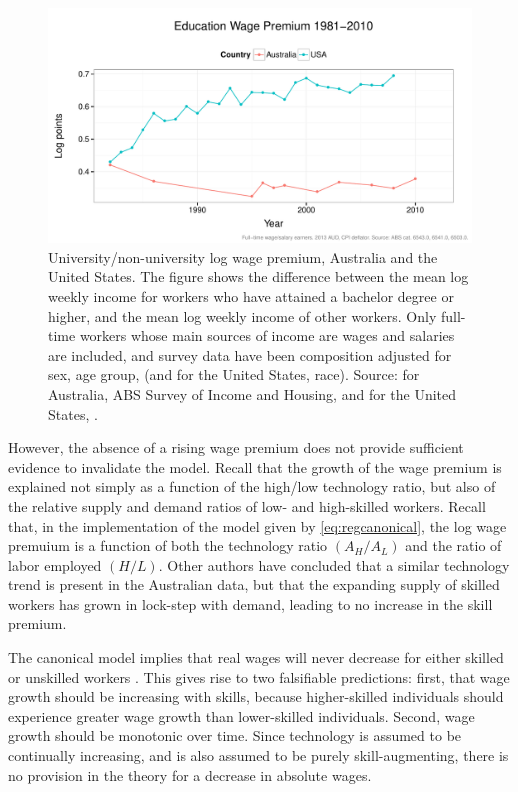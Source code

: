 \begin{figure}[th]
  \centering
  \includegraphics[width=\textwidth]{../figure/ed_premium_time_two.pdf}
  \caption{University/non-university log wage premium, Australia and the United States. The figure shows the difference between the mean log weekly income for workers who have attained a bachelor degree or higher, and the mean log weekly income of other workers. Only full-time workers whose main sources of income are wages and salaries are included, and survey data have been composition adjusted for sex, age group, (and for the United States, race). Source: for Australia, ABS Survey of Income and Housing, and for the United States, \citet{Acemoglu2011}.}
  \label{fig:wagepremium}
\end{figure}

However, the absence of a rising wage premium does not provide sufficient evidence to invalidate the model. Recall that the growth of the wage premium is explained not simply as a function of the high/low technology ratio, but also of the relative supply and demand ratios of low- and high-skilled workers. Recall that, in the \citet{Katz1992} implementation of the model given by \eqref{eq:regcanonical}, the log wage premuium is a function of both the technology ratio $(A_H/A_L)$ and the ratio of labor employed $(H/L)$. Other authors have concluded that a similar technology trend is present in the Australian data, but that the expanding supply of skilled workers has grown in lock-step with demand, leading to no increase in the skill premium.

The canonical model implies that real wages will never decrease for either skilled or unskilled workers \citep{Acemoglu2011}. This gives rise to two falsifiable predictions: first, that wage growth should be increasing with skills, because higher-skilled individuals should experience greater wage growth than lower-skilled individuals. Second, wage growth should be monotonic over time. Since technology is assumed to be continually increasing, and is also assumed to be purely skill-augmenting, there is no provision in the theory for a decrease in absolute wages.


